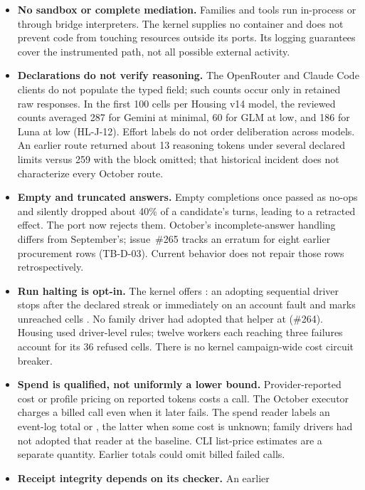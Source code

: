 \begin{itemize}
\item \textbf{No sandbox or complete mediation.} Families and tools run
  in-process or through bridge interpreters. The kernel supplies no
  container and does not prevent code from touching resources outside
  its ports. Its logging guarantees cover the instrumented path, not
  all possible external activity.
\item \textbf{Declarations do not verify reasoning.} The OpenRouter and
  Claude Code clients do not populate the typed
   field; such counts occur only in retained raw
  responses. In the first 100 cells per Housing v14 model, the reviewed
  counts averaged 287 for Gemini at minimal, 60 for GLM at low, and 186
  for Luna at low (HL-J-12). Effort labels do not order deliberation
  across models. An earlier route returned about 13 reasoning tokens
  under several declared limits versus 259 with the block omitted;
  that historical incident does not characterize every October route.
\item \textbf{Empty and truncated answers.} Empty completions once
  passed as no-ops and silently dropped about 40\% of a candidate's
  turns, leading to a retracted effect. The port now rejects them.
  October's incomplete-answer handling differs from September's;
  issue~\#265 tracks an erratum for eight earlier procurement rows
  (TB-D-03). Current behavior does not repair those rows retrospectively.
\item \textbf{Run halting is opt-in.} The kernel offers
  : an adopting sequential
  driver stops after the declared streak or immediately on an account
  fault and marks unreached cells . No family
  driver had adopted that helper at  (\#264). Housing
  used driver-level rules; twelve workers each reaching three failures
  account for its 36 refused cells. There is no kernel campaign-wide
  cost circuit breaker.
\item \textbf{Spend is qualified, not uniformly a lower bound.}
  Provider-reported cost or profile pricing on reported tokens costs a
  call. The October executor charges a billed call even when it later
  fails. The spend reader labels an event-log total  or
  , the latter when some cost is unknown; family
  drivers had not adopted that reader at the baseline. CLI list-price
  estimates are a separate quantity. Earlier totals could omit billed
  failed calls.
\item \textbf{Receipt integrity depends on its checker.} An earlier

\end{itemize}
